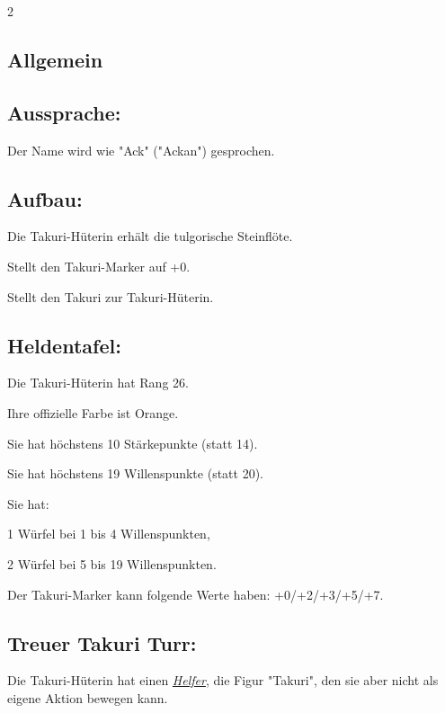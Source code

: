 \documentclass[10pt, a4paper, oneside]{book}
\newcommand{\fan}[1]{\textit{#1}}
\begin{document}
\begin{multicols*}{2}\raggedcolumns


\begin{nobgcolor}

\section{Allgemein}


\subsection{Aussprache:}

Der Name wird wie "Ack" ("Ackan") gesprochen.
\supercite{MH:Begleitheft}


\subsection{Aufbau:}

Die Takuri-Hüterin erhält die tulgorische Steinflöte.

Stellt den Takuri-Marker auf +0.
\supercite{MH:Takuri}

Stellt den Takuri zur Takuri-Hüterin.
\supercite{MH:Begleitheft}




\subsection{Heldentafel:}

Die Takuri-Hüterin hat Rang 26.

Ihre offizielle Farbe ist Orange.

Sie hat höchstens 10 Stärkepunkte (statt 14).

Sie hat höchstens 19 Willenspunkte (statt 20).

Sie hat:

\bullet{} 1 Würfel bei 1 bis 4 Willenspunkten, 

\bullet{} 2 Würfel bei 5 bis 19 Willenspunkten.

Der Takuri-Marker kann folgende Werte haben: +0/+2/+3/+5/+7.








\subsection{Treuer Takuri Turr:}

Die Takuri-Hüterin hat einen \hyperref[Helfer]{\fan{Helfer}}, die Figur "Takuri", den sie aber nicht als eigene Aktion bewegen kann.


\end{nobgcolor}
\end{multicols*}
\end{document}
